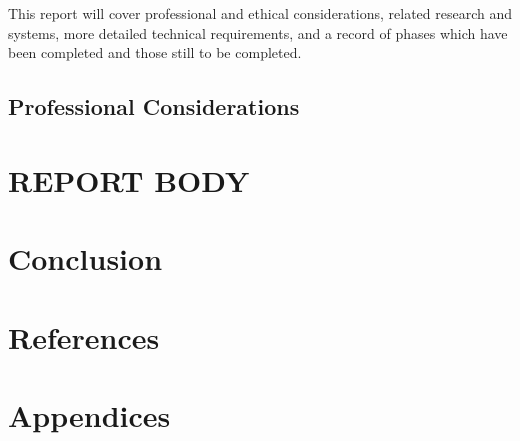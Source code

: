 \documentclass{article}
\begin{document}
%


This report will cover professional and ethical considerations, related research and systems, more detailed technical requirements, and a record of phases which have been completed and those still to be completed.

\subsection{Professional Considerations}



\section{REPORT BODY}



\section{Conclusion}



\section{References}


\section{Appendices}
\end{document}
